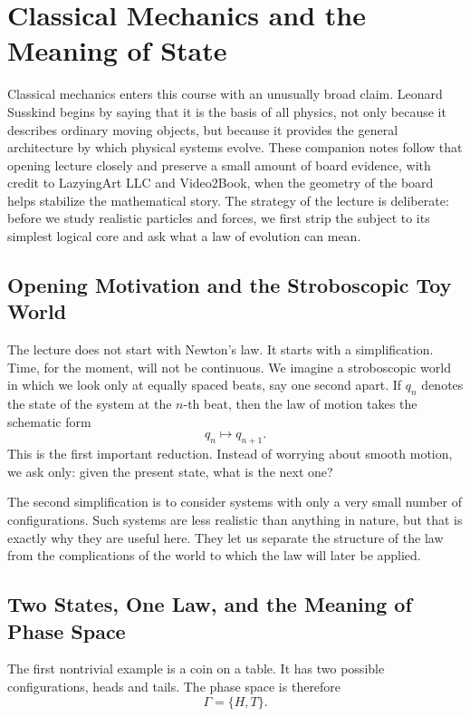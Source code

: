 \chapter{Classical Mechanics and the Meaning of State}

Classical mechanics enters this course with an unusually broad claim. Leonard Susskind begins by saying that it is the basis of all physics, not only because it describes ordinary moving objects, but because it provides the general architecture by which physical systems evolve. These companion notes follow that opening lecture closely and preserve a small amount of board evidence, with credit to LazyingArt LLC and Video2Book, when the geometry of the board helps stabilize the mathematical story. The strategy of the lecture is deliberate: before we study realistic particles and forces, we first strip the subject to its simplest logical core and ask what a law of evolution can mean.

\section{Opening Motivation and the Stroboscopic Toy World}

The lecture does not start with Newton's law. It starts with a simplification. Time, for the moment, will not be continuous. We imagine a stroboscopic world in which we look only at equally spaced beats, say one second apart. If \(q_n\) denotes the state of the system at the \(n\)-th beat, then the law of motion takes the schematic form
\begin{equation}
q_n \mapsto q_{n+1}.
\end{equation}
This is the first important reduction. Instead of worrying about smooth motion, we ask only: given the present state, what is the next one?

The second simplification is to consider systems with only a very small number of configurations. Such systems are less realistic than anything in nature, but that is exactly why they are useful here. They let us separate the structure of the law from the complications of the world to which the law will later be applied.

\section{Two States, One Law, and the Meaning of Phase Space}

The first nontrivial example is a coin on a table. It has two possible configurations, heads and tails. The phase space is therefore
\begin{equation}
\Gamma=\{H,T\}.
\end{equation}

